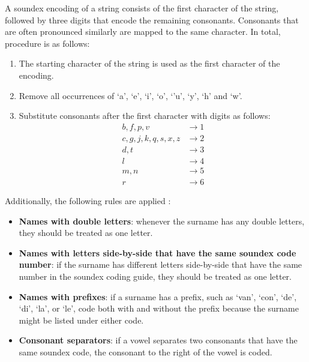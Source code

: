 A soundex encoding of a string consists of the first character of the string, followed by three digits that encode the remaining consonants.
Consonants that are often pronounced similarly are mapped to the same character.
In total, procedure is as follows:

\begin{enumerate}
    \item The starting character of the string is used as the first character of the encoding.
    \item Remove all occurrences of `a', `e', `i', `o', `'u', `y', `h' and `w'.
    \item Substitute consonants after the first character with digits as follows:\\
            \begin{align*}
                b, f, p, v &\rightarrow 1 \\
                c, g, j, k, q, s, x, z &\rightarrow 2 \\
                d, t &\rightarrow 3 \\
                l &\rightarrow 4 \\
                m, n &\rightarrow 5 \\
                r &\rightarrow 6
            \end{align*}
\end{enumerate}

Additionally, the following rules are applied \citep{Soundex}:

\begin{itemize}
    \item \textbf{Names with double letters}: whenever the surname has any double letters, they should be treated as one letter.
    \item \textbf{Names with letters side-by-side that have the same soundex code number}: if the surname has different letters side-by-side that have the same number in the soundex coding guide, they should be treated as one letter.
    \item \textbf{Names with prefixes}: if a surname has a prefix, such as `van', `con', `de', `di', `la', or `le', code both with and without the prefix because the surname might be listed under either code.
    \item \textbf{Consonant separators}: if a vowel separates two consonants that have the same soundex code, the consonant to the right of the vowel is coded.
\end{itemize}


